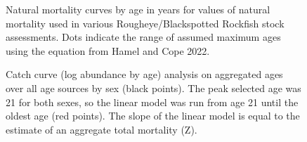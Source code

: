 \documentclass[
]{scrartcl}
\begin{document}
\begin{figure}


\caption{\label{fig-Mcurves}Natural mortality curves by age in years for
values of natural mortality used in various Rougheye/Blackspotted
Rockfish stock assessments. Dots indicate the range of assumed maximum
ages using the equation from Hamel and Cope 2022.}

\end{figure}%

\begin{figure}


\caption{\label{fig-CC_Z}Catch curve (log abundance by age) analysis on
aggregated ages over all age sources by sex (black points). The peak
selected age was 21 for both sexes, so the linear model was run from age
21 until the oldest age (red points). The slope of the linear model is
equal to the estimate of an aggregate total mortality (Z).}

\end{figure}%
\end{document}
